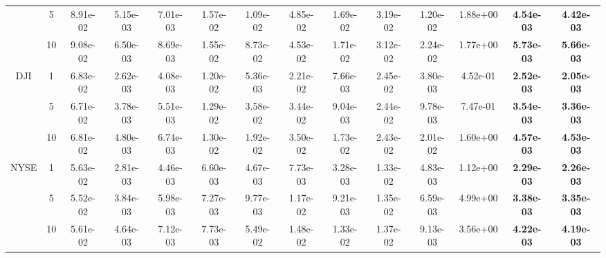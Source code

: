 \begin{table*}[!t]
{\begin{tabular}{cccccccccccccc}
                                     & 5                  & 8.91e-02                        & 5.15e-03                     & 7.01e-03                   & 1.57e-02                     & 1.09e-02          & 4.85e-02          & 1.69e-02 & 3.19e-02 & 1.20e-02          & 1.88e+00 & \textbf{4.54e-03} & \textbf{4.42e-03}\s \\ \cmidrule(l){3-14}
                                     & 10                 & 9.08e-02                        & 6.50e-03                     & 8.69e-03                   & 1.55e-02                     & 8.73e-02          & 4.53e-02          & 1.71e-02 & 3.12e-02 & 2.24e-02          & 1.77e+00 & \textbf{5.73e-03} & \textbf{5.66e-03}\s \\ \cmidrule(l){2-14}
            \multirow{3}{*}{DJI}     & 1                  & 6.83e-02                        & 2.62e-03                     & 4.08e-03                   & 1.20e-02                     & 5.36e-03          & 2.21e-02          & 7.66e-03 & 2.45e-02 & 3.80e-03          & 4.52e-01 & \textbf{2.52e-03} & \textbf{2.05e-03}\s \\ \cmidrule(l){3-14}
                                     & 5                  & 6.71e-02                        & 3.78e-03                     & 5.51e-03                   & 1.29e-02                     & 3.58e-02          & 3.44e-02          & 9.04e-03 & 2.44e-02 & 9.78e-03          & 7.47e-01 & \textbf{3.54e-03} & \textbf{3.36e-03}\s \\ \cmidrule(l){3-14}
                                     & 10                 & 6.81e-02                        & 4.80e-03                     & 6.74e-03                   & 1.30e-02                     & 1.92e-02          & 3.50e-02          & 1.73e-02 & 2.43e-02 & 2.01e-02          & 1.60e+00 & \textbf{4.57e-03} & \textbf{4.53e-03}\s \\ \cmidrule(l){2-14}
            \multirow{3}{*}{NYSE}    & 1                  & 5.63e-02                        & 2.81e-03                     & 4.46e-03                   & 6.60e-03                     & 4.67e-03          & 7.73e-03          & 3.28e-03 & 1.33e-02 & 4.83e-03          & 1.12e+00 & \textbf{2.29e-03} & \textbf{2.26e-03}\s \\ \cmidrule(l){3-14}
                                     & 5                  & 5.52e-02                        & 3.84e-03                     & 5.98e-03                   & 7.27e-03                     & 9.77e-03          & 1.17e-02          & 9.21e-03 & 1.35e-02 & 6.59e-03          & 4.99e+00 & \textbf{3.38e-03} & \textbf{3.35e-03}\s \\ \cmidrule(l){3-14}
                                     & 10                 & 5.61e-02                        & 4.64e-03                     & 7.12e-03                   & 7.73e-03                     & 5.49e-02          & 1.48e-02          & 1.33e-02 & 1.37e-02 & 9.13e-03          & 3.56e+00 & \textbf{4.22e-03} & \textbf{4.19e-03}\s \\ \bottomrule
        \end{tabular}}
\end{table*}
